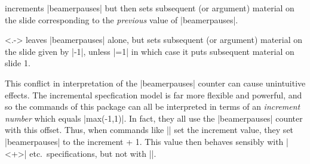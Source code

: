 \documentclass[a4paper]{ltxdoc}
\begin{document}
\begin{command}{\onslide<+->}
  increments |beamerpauses| but then sets subsequent (or argument) material on
  the slide corresponding to the \emph{previous} value of |beamerpauses|.
\end{command}

\begin{command}{\onslide<.->}
  leaves |beamerpauses| alone, but sets subsequent (or argument) material on the
  slide given by |\value{beamerpauses}-1|, unless |\value{beamerpauses}=1| in
  which case it puts subsequent material on slide 1.
\end{command}

This conflict in interpretation of the |beamerpauses| counter can cause
unintuitive effects.  The incremental specfication model is far more flexible
and powerful, and so the commands of this package can all be interpreted in
terms of an \emph{increment number} which equals
|max(\value{beamerpauses}-1,1)|.  In fact, they all use the |beamerpauses|
counter with this offset.  Thus, when commands like |\resetincr| set the
increment value, they set |beamerpauses| to the increment + 1.  This value then
behaves sensibly with |<+>| etc.\ specifications, but not with |\pause|.  





%




%  
% 
\end{document}
